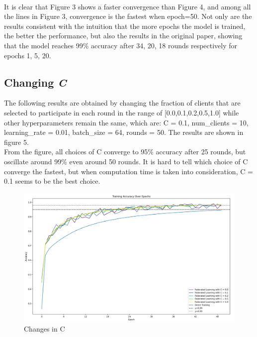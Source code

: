 \documentclass[a4paper,12pt]{article}
\begin{document}
\\It is clear that Figure 3 shows a faster convergence than Figure 4, and 
among all the lines in Figure 3, convergence is the fastest when epoch=50.
Not only are the results consistent with the intuition that the more epochs the model is trained, the better the performance,
but also the results in the original paper, showing that the model reaches 99\% accuracy
after 34, 20, 18 rounds respectively for epochs 1, 5, 20.


\subsection{Changing \textit{C}}
The following results are obtained by changing the fraction of clients that are selected to participate in each round in the range of 
[0.0,0.1,0.2,0.5,1.0] while other hyperparameters remain the same, which are:
C = 0.1, num\_clients = 10, learning\_rate = 0.01, batch\_size = 64, rounds = 50. 
The results are shown in figure 5.\\
From the figure, all choices of C converge to 95\% accuracy after 25 rounds,
but oscillate around 99\% even around 50 rounds. It is hard to tell which choice of C
converge the fastest, but when computation time is taken into consideration, C = 0.1 seems to be the best choice.
\newpage
\begin{figure}[htbp]
    \centering
    \includegraphics[width=1\textwidth]{C_change.png} %
    \vspace{-1cm}
    \caption{Changes in C}
\end{figure}
\end{document}
